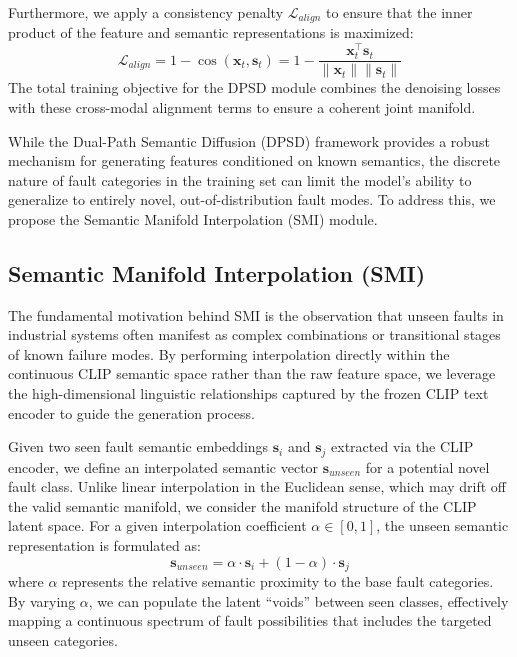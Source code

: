 \documentclass[journal]{IEEEtran}
\begin{document}
Furthermore, we apply a consistency penalty $\mathcal{L}_{align}$ to ensure that the inner product of the feature and semantic representations is maximized:
\begin{equation}
\mathcal{L}_{align} = 1 - \cos(\mathbf{x}_t, \mathbf{s}_t) = 1 - \frac{\mathbf{x}_t^\top \mathbf{s}_t}{\|\mathbf{x}_t\| \|\mathbf{s}_t\|}
\end{equation}
The total training objective for the DPSD module combines the denoising losses with these cross-modal alignment terms to ensure a coherent joint manifold.

While the Dual-Path Semantic Diffusion (DPSD) framework provides a robust mechanism for generating features conditioned on known semantics, the discrete nature of fault categories in the training set can limit the model's ability to generalize to entirely novel, out-of-distribution fault modes. To address this, we propose the Semantic Manifold Interpolation (SMI) module.

\subsection{Semantic Manifold Interpolation (SMI)}
The fundamental motivation behind SMI is the observation that unseen faults in industrial systems often manifest as complex combinations or transitional stages of known failure modes. By performing interpolation directly within the continuous CLIP semantic space rather than the raw feature space, we leverage the high-dimensional linguistic relationships captured by the frozen CLIP text encoder to guide the generation process.

Given two seen fault semantic embeddings $\mathbf{s}_i$ and $\mathbf{s}_j$ extracted via the CLIP encoder, we define an interpolated semantic vector $\mathbf{s}_{unseen}$ for a potential novel fault class. Unlike linear interpolation in the Euclidean sense, which may drift off the valid semantic manifold, we consider the manifold structure of the CLIP latent space. For a given interpolation coefficient $\alpha \in [0, 1]$, the unseen semantic representation is formulated as:
\begin{equation}
\mathbf{s}_{unseen} = \alpha \cdot \mathbf{s}_i + (1 - \alpha) \cdot \mathbf{s}_j
\end{equation}
where $\alpha$ represents the relative semantic proximity to the base fault categories. By varying $\alpha$, we can populate the latent ``voids'' between seen classes, effectively mapping a continuous spectrum of fault possibilities that includes the targeted unseen categories.
\end{document}
